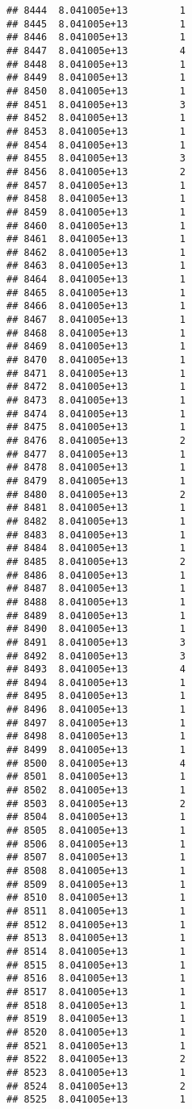 \documentclass[
]{article}
\begin{document}
\begin{verbatim}
## 8444  8.041005e+13         1
## 8445  8.041005e+13         1
## 8446  8.041005e+13         1
## 8447  8.041005e+13         4
## 8448  8.041005e+13         1
## 8449  8.041005e+13         1
## 8450  8.041005e+13         1
## 8451  8.041005e+13         3
## 8452  8.041005e+13         1
## 8453  8.041005e+13         1
## 8454  8.041005e+13         1
## 8455  8.041005e+13         3
## 8456  8.041005e+13         2
## 8457  8.041005e+13         1
## 8458  8.041005e+13         1
## 8459  8.041005e+13         1
## 8460  8.041005e+13         1
## 8461  8.041005e+13         1
## 8462  8.041005e+13         1
## 8463  8.041005e+13         1
## 8464  8.041005e+13         1
## 8465  8.041005e+13         1
## 8466  8.041005e+13         1
## 8467  8.041005e+13         1
## 8468  8.041005e+13         1
## 8469  8.041005e+13         1
## 8470  8.041005e+13         1
## 8471  8.041005e+13         1
## 8472  8.041005e+13         1
## 8473  8.041005e+13         1
## 8474  8.041005e+13         1
## 8475  8.041005e+13         1
## 8476  8.041005e+13         2
## 8477  8.041005e+13         1
## 8478  8.041005e+13         1
## 8479  8.041005e+13         1
## 8480  8.041005e+13         2
## 8481  8.041005e+13         1
## 8482  8.041005e+13         1
## 8483  8.041005e+13         1
## 8484  8.041005e+13         1
## 8485  8.041005e+13         2
## 8486  8.041005e+13         1
## 8487  8.041005e+13         1
## 8488  8.041005e+13         1
## 8489  8.041005e+13         1
## 8490  8.041005e+13         1
## 8491  8.041005e+13         3
## 8492  8.041005e+13         3
## 8493  8.041005e+13         4
## 8494  8.041005e+13         1
## 8495  8.041005e+13         1
## 8496  8.041005e+13         1
## 8497  8.041005e+13         1
## 8498  8.041005e+13         1
## 8499  8.041005e+13         1
## 8500  8.041005e+13         4
## 8501  8.041005e+13         1
## 8502  8.041005e+13         1
## 8503  8.041005e+13         2
## 8504  8.041005e+13         1
## 8505  8.041005e+13         1
## 8506  8.041005e+13         1
## 8507  8.041005e+13         1
## 8508  8.041005e+13         1
## 8509  8.041005e+13         1
## 8510  8.041005e+13         1
## 8511  8.041005e+13         1
## 8512  8.041005e+13         1
## 8513  8.041005e+13         1
## 8514  8.041005e+13         1
## 8515  8.041005e+13         1
## 8516  8.041005e+13         1
## 8517  8.041005e+13         1
## 8518  8.041005e+13         1
## 8519  8.041005e+13         1
## 8520  8.041005e+13         1
## 8521  8.041005e+13         1
## 8522  8.041005e+13         2
## 8523  8.041005e+13         1
## 8524  8.041005e+13         2
## 8525  8.041005e+13         1

\end{verbatim}
\end{document}
